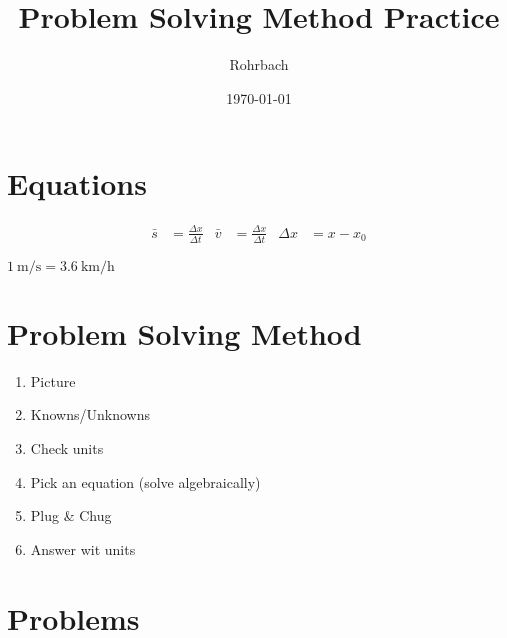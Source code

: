 \documentclass[10pt]{exam}
\title{Problem Solving Method Practice}
\author{Rohrbach}
\date{\today}
\begin{document}
\maketitle

\section*{Equations}

\begin{center}
  \begin{align*}
    \bar{s} &= \frac{\Delta x}{\Delta t} &
    \bar{v} &= \frac{\Delta x}{\Delta t} &
    \Delta x &= x - x_0
  \end{align*}

  \vspace{1em}

  $\SI{1}{\meter\per\second}=\SI{3.6}{\kilo\meter\per\hour}$
\end{center}

\section*{Problem Solving Method}

\begin{enumerate}
  \item Picture
  \item Knowns/Unknowns
  \item Check units
  \item Pick an equation (solve algebraically)
  \item Plug \& Chug
  \item Answer wit units
\end{enumerate}

\section*{Problems}
\end{document}
